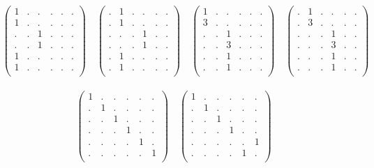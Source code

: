 \documentclass[12pt,a4paper]{amsart}
\begin{document}
\begin{align*}
  \left(
  \begin{array}{rrrr|rr}
    1&.&.&.&.&.\\
    1&.&.&.&.&.\\
    .&.&1&.&.&.\\
    .&.&1&.&.&.\\ \hline
    1&.&.&.&.&.\\
    1&.&.&.&.&.\\
  \end{array}
\right)
\quad
  \left(
  \begin{array}{rrrr|rr}
    .&1&.&.&.&.\\
    .&1&.&.&.&.\\
    .&.&.&1&.&.\\
    .&.&.&1&.&.\\ \hline
    .&1&.&.&.&.\\
    .&1&.&.&.&.\\
  \end{array}
\right)
\quad
  \left(
  \begin{array}{rrrr|rr}
    1&.&.&.&.&.\\
    3&.&.&.&.&.\\
    .&.&1&.&.&.\\
    .&.&3&.&.&.\\ \hline
    .&.&1&.&.&.\\
    .&.&1&.&.&.\\
  \end{array}
\right)
\quad
  \left(
  \begin{array}{rrrr|rr}
    .&1&.&.&.&.\\
    .&3&.&.&.&.\\
    .&.&.&1&.&.\\
    .&.&.&3&.&.\\ \hline
    .&.&.&1&.&.\\
    .&.&.&1&.&.\\
  \end{array}
\right)
\end{align*}

\begin{align*}
  \left(
  \begin{array}{rrrr|rr}
    1&.&.&.&.&.\\
    .&1&.&.&.&.\\
    .&.&1&.&.&.\\
    .&.&.&1&.&.\\ \hline
    .&.&.&.&1&.\\
    .&.&.&.&.&1\\
  \end{array}
\right)
\quad
  \left(
  \begin{array}{rrrr|rr}
    1&.&.&.&.&.\\
    .&1&.&.&.&.\\
    .&.&1&.&.&.\\
    .&.&.&1&.&.\\ \hline
    .&.&.&.&.&1\\
    .&.&.&.&1&.\\
  \end{array}
\right)
\end{align*}
\end{document}
